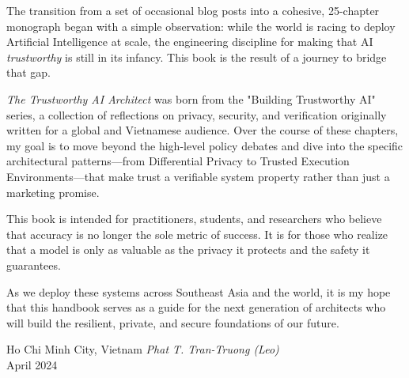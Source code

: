 % 
%

\preface

The transition from a set of occasional blog posts into a cohesive, 25-chapter monograph began with a simple observation: while the world is racing to deploy Artificial Intelligence at scale, the engineering discipline for making that AI \textit{trustworthy} is still in its infancy. This book is the result of a journey to bridge that gap.

\textit{The Trustworthy AI Architect} was born from the "Building Trustworthy AI" series, a collection of reflections on privacy, security, and verification originally written for a global and Vietnamese audience. Over the course of these chapters, my goal is to move beyond the high-level policy debates and dive into the specific architectural patterns---from Differential Privacy to Trusted Execution Environments---that make trust a verifiable system property rather than just a marketing promise.

This book is intended for practitioners, students, and researchers who believe that accuracy is no longer the sole metric of success. It is for those who realize that a model is only as valuable as the privacy it protects and the safety it guarantees.

As we deploy these systems across Southeast Asia and the world, it is my hope that this handbook serves as a guide for the next generation of architects who will build the resilient, private, and secure foundations of our future.

\vspace{\baselineskip}
\begin{flushright}\noindent
Ho Chi Minh City, Vietnam \hfill {\it Phat T. Tran-Truong (Leo)}\\
April 2024 \hfill {\it }\\
\end{flushright}

